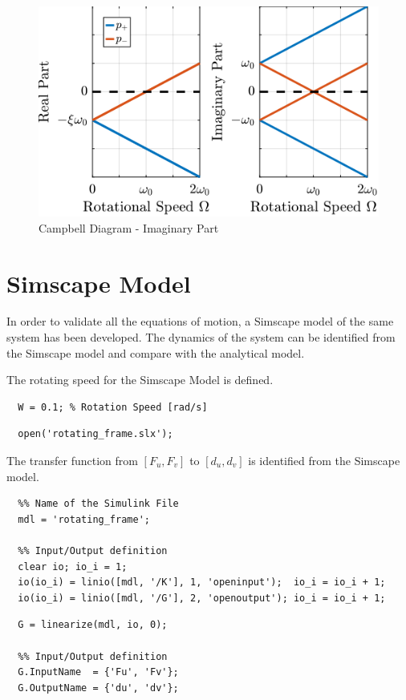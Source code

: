\documentclass[a4paper, 10pt, DIV=12, parskip=full]{scrreprt}
\begin{document}
\begin{figure}[htbp]
\centering
\includegraphics[scale=1]{figs/campbell_diagram_imag.png}
\caption{\label{fig:campbell_diagram_imag}Campbell Diagram - Imaginary Part}
\end{figure}

\section{Simscape Model}
\label{sec:org50f1e50}
In order to validate all the equations of motion, a Simscape model of the same system has been developed.
The dynamics of the system can be identified from the Simscape model and compare with the analytical model.

The rotating speed for the Simscape Model is defined.
\begin{verbatim}
  W = 0.1; % Rotation Speed [rad/s]
\end{verbatim}

\begin{verbatim}
  open('rotating_frame.slx');
\end{verbatim}

The transfer function from \([F_u, F_v]\) to \([d_u, d_v]\) is identified from the Simscape model.

\begin{verbatim}
  %% Name of the Simulink File
  mdl = 'rotating_frame';

  %% Input/Output definition
  clear io; io_i = 1;
  io(io_i) = linio([mdl, '/K'], 1, 'openinput');  io_i = io_i + 1;
  io(io_i) = linio([mdl, '/G'], 2, 'openoutput'); io_i = io_i + 1;
\end{verbatim}

\begin{verbatim}
  G = linearize(mdl, io, 0);

  %% Input/Output definition
  G.InputName  = {'Fu', 'Fv'};
  G.OutputName = {'du', 'dv'};
\end{verbatim}
\end{document}
